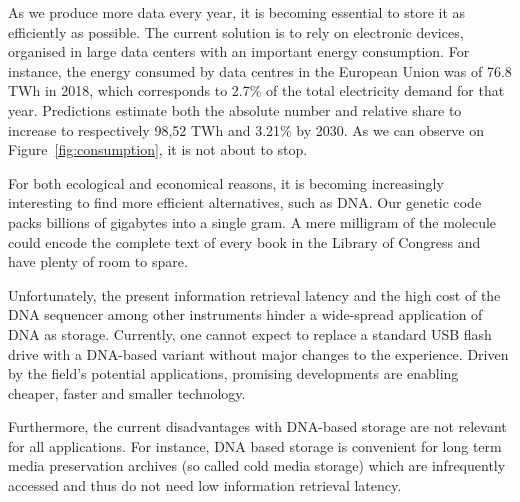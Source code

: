 
As we produce more data every year, it is becoming essential to store it as efficiently as possible. The current solution is to rely on electronic devices, organised in large data centers with an important energy consumption. For instance, the energy consumed by data centres in the European Union was of 76.8 TWh in 2018, which corresponds to 2.7\% of the total electricity demand for that year. Predictions estimate both the absolute number and relative share to increase to respectively 98,52 TWh and 3.21\% by 2030. As we can observe on Figure~\ref{fig:consumption}, it is not about to stop.




For both ecological and economical reasons, it is becoming increasingly interesting to find more efficient alternatives, such as DNA. Our genetic code packs billions of gigabytes into a single gram. A mere milligram of the molecule could encode the complete text of every book in the Library of Congress and have plenty of room to spare. \cite{bib:dna_data_storage}

Unfortunately, the present information retrieval latency and the high cost of the DNA sequencer among other instruments hinder a wide-spread application of DNA as storage. Currently, one cannot expect to replace a standard USB flash drive with a DNA-based variant without major changes to the experience. \cite{bib:dna_data_storage} Driven by the field's potential applications, promising developments are enabling cheaper, faster and smaller technology. 


Furthermore, the current disadvantages with DNA-based storage are not relevant for all applications. For instance, DNA based storage is convenient for long term media preservation archives (so called cold media storage) which are infrequently accessed and thus do not need low information retrieval latency. \cite{bib:Panda2018}

